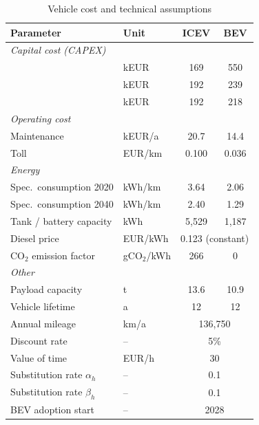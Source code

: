 \documentclass[conference]{IEEEtran}
\begin{document}
\begin{table}[htbp]
\caption{Vehicle cost and technical assumptions}
\label{tab:vehicle_assumptions}
\begin{center}
\footnotesize
\begin{tabular}{@{}l l c c@{}}
\toprule
\textbf{Parameter} & \textbf{Unit} & \textbf{ICEV} & \textbf{BEV} \\
\midrule
\multicolumn{4}{l}{\textit{Capital cost (CAPEX)}} \\
\quad 2020 & kEUR & 169 & 550 \\
\quad 2030 & kEUR & 192 & 239 \\
\quad 2040 & kEUR & 192 & 218 \\
\midrule
\multicolumn{4}{l}{\textit{Operating cost}} \\
\quad Maintenance & kEUR/a & 20.7 & 14.4 \\
\quad Toll & EUR/km & 0.100 & 0.036 \\
\midrule
\multicolumn{4}{l}{\textit{Energy}} \\
\quad Spec.\ consumption 2020 & kWh/km & 3.64 & 2.06 \\
\quad Spec.\ consumption 2040 & kWh/km & 2.40 & 1.29 \\
\quad Tank / battery capacity & kWh & 5{,}529 & 1{,}187 \\
\quad Diesel price & EUR/kWh & \multicolumn{2}{c}{0.123 (constant)} \\
\quad CO$_2$ emission factor & gCO$_2$/kWh & 266 & 0 \\
\midrule
\multicolumn{4}{l}{\textit{Other}} \\
\quad Payload capacity & t & 13.6 & 10.9 \\
\quad Vehicle lifetime & a & 12 & 12 \\
\quad Annual mileage & km/a & \multicolumn{2}{c}{136{,}750} \\
\quad Discount rate & -- & \multicolumn{2}{c}{5\%} \\
\quad Value of time & EUR/h & \multicolumn{2}{c}{30} \\
\quad Substitution rate $\alpha_h$ & -- & \multicolumn{2}{c}{0.1} \\
\quad Substitution rate $\beta_h$ & -- & \multicolumn{2}{c}{0.1} \\
\quad BEV adoption start & -- & \multicolumn{2}{c}{2028} \\
\bottomrule
\end{tabular}
\end{center}
\end{table}
\end{document}
